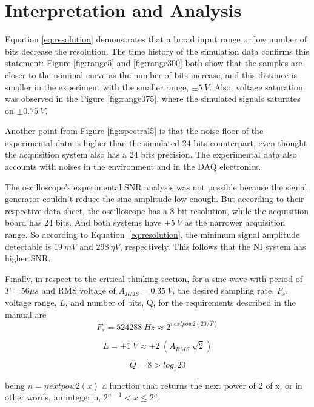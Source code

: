 \documentclass[10pt,letterpaper,twocolumn]{article}
\begin{document}
\section{Interpretation and Analysis}
    Equation \ref{eq:resolution} demonstrates that a broad input range or low number of bits decrease the resolution. The time history of the simulation data confirms this statement: Figure \ref{fig:range5} and \ref{fig:range300} both show that the samples are closer to the nominal curve as the number of bits increase, and this distance is smaller in the experiment with the smaller range, $\pm 5\ V$. Also, voltage saturation was observed in the Figure \ref{fig:range075}, where the simulated signals saturates on $\pm 0.75\ V$.
    
    Another point from Figure \ref{fig:spectral5} is that the noise floor of the experimental data is higher than the simulated 24 bits counterpart, even thought the acquisition system also has a 24 bits precision. The experimental data also accounts with noises in the environment and in the DAQ electronics. 
    
    The oscilloscope's experimental SNR analysis was not possible because the signal generator couldn't reduce the sine amplitude low enough. But according to their respective data-sheet, the oscilloscope has a 8 bit resolution, while the acquisition board has 24 bits. And both systems have $\pm 5\ V$ as the narrower acquisition range. So according to Equation~\ref{eq:resolution}, the minimum signal amplitude detectable is $19\ mV$ and $298\ \eta V$, respectively. This follows that the NI system has higher SNR.
    
    Finally, in respect to the critical thinking section, for a sine wave with period of $T = 56 \mu s$ and RMS voltage of $A_{RMS} = 0.35\ V$, the desired sampling rate, $F_s$, voltage range, $L$, and number of bits, Q, for the requirements described in the manual are
    \begin{equation}
    F_s = 524288\ Hz \approx 2^{nextpow2(20/T)}
    \end{equation}
    
    \begin{equation}
    L = \pm 1\ V \approx \pm 2\ (A_{RMS}\ \sqrt 2)
    \end{equation}
    
    \begin{equation}
    Q = 8 > log_2 20
    \end{equation}
    
    being $n = nextpow2(x)$ a function that returns the next power of 2 of x, or in other words, an integer n, $2^{n-1} < x \leq 2^n$.
    
\end{document}
